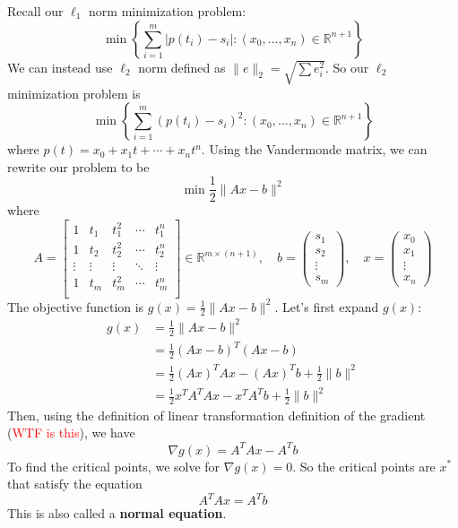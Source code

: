 \begin{problem}
  Recall our $\ell_1$ norm minimization problem:
  $$\min \left\{\sum^m_{i=1}|p(t_i) - s_i| : (x_0,\ldots,x_n) \in \mathbb R^{n+1}\right\}$$
  We can instead use $\ell_2$ norm defined as $\|e\|_2 = \sqrt{\sum e_i^2}$. So our $\ell_2$ minimization problem is $$\min \left\{\sum^m_{i=1}(p(t_i) - s_i)^2 : (x_0,\ldots,x_n) \in \mathbb R^{n+1}\right\}$$ where $p(t) = x_0 + x_1t + \cdots + x_nt^n$. Using the Vandermonde matrix, we can rewrite our problem to be
  $$\min \frac{1}{2} \|Ax - b\|^2$$ where $$A = \begin{bmatrix}
    1 & t_1 & t_1^2 & \cdots & t_1^n\\
    1 & t_2 & t_2^2 & \cdots & t_2^n\\
    \vdots & \vdots & \vdots & \ddots & \vdots\\
    1 & t_m & t_m^2 & \cdots & t_m^n\\
  \end{bmatrix} \in \mathbb R^{m \times (n+1)}, \quad b = \begin{pmatrix}
    s_1 \\ s_2 \\ \vdots \\ s_m
  \end{pmatrix}, \quad x = \begin{pmatrix}
    x_0 \\ x_1 \\ \vdots \\ x_n
  \end{pmatrix}$$
  The objective function is $g(x) = \frac{1}{2}\|Ax - b\|^2$. Let's first expand $g(x)$:
  \begin{align*}
    g(x) &= \frac{1}{2} \|Ax - b \|^2 \\
    &= \frac{1}{2}(Ax - b)^T (Ax - b) \\
    &= \frac{1}{2} (Ax)^T Ax - (Ax)^Tb + \frac{1}{2} \|b \|^2 \\
    &= \frac{1}{2} x^T A^T Ax - x^T A^T b + \frac{1}{2} \|b \|^2 
  \end{align*}
  Then, using the definition of linear transformation definition of the gradient (\textcolor{red}{WTF is this}), we have $$\nabla g(x) = A^T Ax - A^T b$$
  To find the critical points, we solve for $\nabla g(x) = 0$. So the critical points are $x^*$ that satisfy the equation
  $$A^TAx = A^Tb$$
  This is also called a \textbf{normal equation}.
\end{problem}

